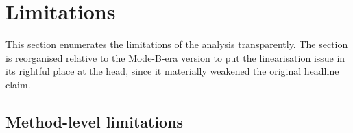 \section{Limitations}\label{sec:limitations}

This section enumerates the limitations of the analysis transparently.
The section is reorganised relative to the Mode-B-era version to put
the linearisation issue in its rightful place at the head, since it
materially weakened the original headline claim.

\subsection{Method-level limitations}

